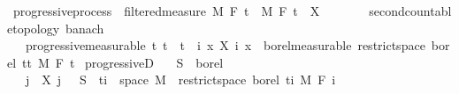 \begin{isabellebody}
{}
\isamarkuptrue%
%
\endisatagdocument
{\isafolddocument}%
%
\isadelimdocument
%
\endisadelimdocument
{}\isamarkupfalse%
\ progressive{\isacharunderscore}{\kern0pt}process\ {\isacharequal}{\kern0pt}\ filtered{\isacharunderscore}{\kern0pt}measure\ M\ F\ t\ \ M\ F\ t\ \ X\ {\isacharcolon}{\kern0pt}{\isacharcolon}{\kern0pt}\ {\isachardoublequoteopen}{\isacharunderscore}{\kern0pt}\ {\isasymRightarrow}\ {\isacharunderscore}{\kern0pt}\ {\isasymRightarrow}\ {\isacharunderscore}{\kern0pt}\ {\isacharcolon}{\kern0pt}{\isacharcolon}{\kern0pt}\ {\isacharbraceleft}{\kern0pt}second{\isacharunderscore}{\kern0pt}countable{\isacharunderscore}{\kern0pt}topology{\isacharcomma}{\kern0pt}\ banach{\isacharbraceright}{\kern0pt}{\isachardoublequoteclose}\ {\isacharplus}{\kern0pt}\isanewline
\ \ \ progressive{\isacharbrackleft}{\kern0pt}measurable{\isacharbrackright}{\kern0pt}{\isacharcolon}{\kern0pt}\ {\isachardoublequoteopen}{\isasymAnd}t{\isachardot}{\kern0pt}\ t\ {\isasymle}\ t\ {\isasymLongrightarrow}\ {\isacharparenleft}{\kern0pt}{\isasymlambda}{\isacharparenleft}{\kern0pt}i{\isacharcomma}{\kern0pt}\ x{\isacharparenright}{\kern0pt}{\isachardot}{\kern0pt}\ X\ i\ x{\isacharparenright}{\kern0pt}\ {\isasymin}\ borel{\isacharunderscore}{\kern0pt}measurable\ {\isacharparenleft}{\kern0pt}restrict{\isacharunderscore}{\kern0pt}space\ borel\ {\isacharbraceleft}{\kern0pt}tt{\isacharbraceright}{\kern0pt}\ {\isasymOtimes}\isactrlsub M\ F\ t{\isacharparenright}{\kern0pt}{\isachardoublequoteclose}\isanewline
{}\isanewline
\isanewline
{}\isamarkupfalse%
\ progressiveD{\isacharcolon}{\kern0pt}\isanewline
\ \ \ {\isachardoublequoteopen}S\ {\isasymin}\ borel{\isachardoublequoteclose}\isanewline
\ \ \ {\isachardoublequoteopen}{\isacharparenleft}{\kern0pt}{\isasymlambda}{\isacharparenleft}{\kern0pt}j{\isacharcomma}{\kern0pt}\ {\isasymxi}{\isacharparenright}{\kern0pt}{\isachardot}{\kern0pt}\ X\ j\ {\isasymxi}{\isacharparenright}{\kern0pt}\ {\isacharminus}{\kern0pt}{\isacharbackquote}{\kern0pt}\ S\ {\isasyminter}\ {\isacharparenleft}{\kern0pt}{\isacharbraceleft}{\kern0pt}ti{\isacharbraceright}{\kern0pt}\ {\isasymtimes}\ space\ M{\isacharparenright}{\kern0pt}\ {\isasymin}\ {\isacharparenleft}{\kern0pt}restrict{\isacharunderscore}{\kern0pt}space\ borel\ {\isacharbraceleft}{\kern0pt}ti{\isacharbraceright}{\kern0pt}\ {\isasymOtimes}\isactrlsub M\ F\ i{\isacharparenright}{\kern0pt}{\isachardoublequoteclose}\ \isanewline

\end{isabellebody}
